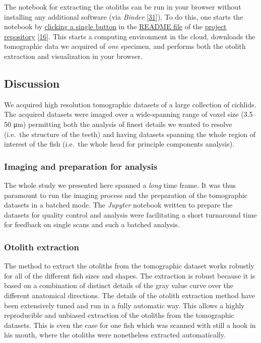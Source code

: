 The notebook for extracting the otoliths can be run in your browser without installing any additional software (via \emph{Binder} {[}\protect\hyperlink{ref-Q20Bxdsr}{31}{]}).
To do this, one starts the notebook by \href{https://mybinder.org/v2/gh/habi/eawag/HEAD?labpath=ExtractOtoliths.ipynb}{clicking a single button} in the \href{https://github.com/habi/EAWAG/blob/master/README.md}{README file} of the \href{https://github.com/habi/EAWAG}{project repository} {[}\protect\hyperlink{ref-1HteOscVd}{16}{]}.
This starts a computing environment in the cloud, downloads the tomographic data we acquired of \emph{one} specimen, and performs both the otolith extraction and visualization in your browser.

\hypertarget{discussion}{%
\subsection{Discussion}\label{discussion}}

We acquired high resolution tomographic datasets of a large collection of cichlids.
The acquired datasets were imaged over a wide-spanning range of voxel size (3.5--50 μm) permitting both the analysis of finest details we wanted to resolve (i.e.~the structure of the teeth) and having datasets spanning the whole region of interest of the fish (i.e.~the whole head for principle components analysis).

\hypertarget{imaging-and-preparation-for-analysis}{%
\subsubsection{Imaging and preparation for analysis}\label{imaging-and-preparation-for-analysis}}

The whole study we presented here spanned a \emph{long} time frame.
It was thus paramount to run the imaging process and the preparation of the tomographic datasets in a batched mode.
The \emph{Jupyter} notebook written to prepare the datasets for quality control and analysis were facilitating a short turnaround time for feedback on single scans and such a batched analysis.

\hypertarget{otolith-extraction}{%
\subsubsection{Otolith extraction}\label{otolith-extraction}}

The method to extract the otoliths from the tomographic dataset works robustly for all of the different fish sizes and shapes.
The extraction is robust because it is based on a combination of distinct details of the gray value curve over the different anatomical directions.
The details of the otolith extraction method have been extensively tuned and run in a fully automatic way.
This allows a highly reproducible and unbiased extraction of the otoliths from the tomographic datasets.
This is even the case for one fish which was scanned with still a hook in his mouth, where the otoliths were nonetheless extracted automatically.

